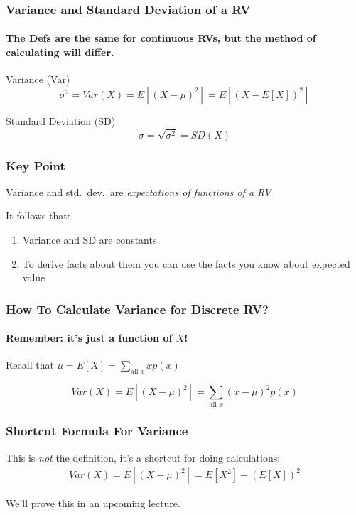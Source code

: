 \documentclass[handout]{beamer}
\begin{document}
\begin{frame}
\frametitle{Variance and Standard Deviation of a RV}
\framesubtitle{The Defs are the same for continuous RVs, but the method of calculating will differ.}

\begin{block}{Variance (Var)}
	$$\sigma^2 = Var(X) = E\left[ (X - \mu)^2\right] = E\left[ (X - E[X])^2\right]$$
\end{block}


\begin{block}{Standard Deviation (SD)}
$$\sigma = \sqrt{\sigma^2} = SD(X)$$
\end{block}


\end{frame}
\begin{frame}
\frametitle{Key Point}

\alert{Variance and std.\ dev.\ are \emph{expectations of functions of a RV}} 

\vspace{1em}

It follows that: 
\begin{enumerate}
\item Variance and SD are constants
\item To derive facts about them you can use the facts you know about expected value
\end{enumerate}
\end{frame}
\begin{frame}
\frametitle{How To Calculate Variance for Discrete RV?}
\framesubtitle{Remember: it's just a function of $X$!}


Recall that	$\displaystyle \mu = E[X] = \sum_{\mbox{all } x} xp(x)$


\vspace{3em}

$$Var(X) = E\left[ (X - \mu)^2 \right] =\sum_{\mbox{all } x} (x - \mu)^2 p(x)$$


\end{frame}
\begin{frame}
\frametitle{Shortcut Formula For Variance}

This is \emph{not} the definition, it's a shortcut for doing calculations:
\begin{eqnarray*}
	Var(X) = E\left[ (X - \mu)^2 \right] = E[X^2] - \left(E[X]\right)^2
\end{eqnarray*}

\alert{We'll prove this in an upcoming lecture.}

\end{frame}
\end{document}
